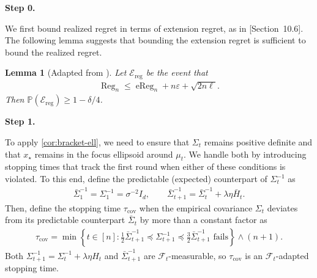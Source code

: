 \documentclass{article}
\newtheorem{lemma}[lemma]{Lemma}
\newcommand{\proofstepinline}[1]{%
    {\normalfont\normalsize\bfseries\color{blue!55!black}Step #1.}\enspace
}
\newcommand{\Pp}{\mathbb P}
\newcommand{\F}{\mathcal F}
\newcommand{\1}{\mathbf 1}
\newcommand{\eps}{\varepsilon}
\begin{document}
\proofstepinline{0}
We first bound realized regret in terms of extension regret, as in \citet{lattimore2026bandit}[Section~10.6]. The following lemma suggests that bounding the extension regret is sufficient to bound the realized regret.
\begin{lemma}[{Adapted from \citet[Section~10.6, Eq.~(10.14)]{lattimore2026bandit}}]
    \label{lem:actual-to-extension}
    Let $\mathcal E_{\mathrm{reg}}$ be the event that
    \begin{align}
        \operatorname{Reg}_n
        \leq
        \operatorname{eReg}_n
        +n\eps+\sqrt{2n\ell}.
        \label{eq:actual-to-extension}
    \end{align}
    Then $\Pp(\mathcal E_{\mathrm{reg}})\geq1-\delta/4$.
\end{lemma}
\proofstepinline{1}
To apply \cref{cor:bracket-ell}, we need to ensure that $\Sigma_t$ remains positive definite and that $x_\star$ remains in the focus ellipsoid around $\mu_t$.
We handle both by introducing stopping times that track the first round when either of these conditions is violated.
To this end, define the predictable (expected) counterpart of $\Sigma_t^{-1}$ as
\begin{align}
    \bar{\Sigma}_1^{-1}=\Sigma_1^{-1}=\sigma^{-2}I_d,
    \qquad
    \bar{\Sigma}_{t+1}^{-1}
    =\bar{\Sigma}_t^{-1}+\lambda\eta \bar{H}_t.
    \label{eq:predictable-covariance}
\end{align}
Then, define the stopping time $\tau_{\mathrm{cov}}$ when the empirical covariance $\Sigma_t$ deviates from its predictable counterpart $\bar{\Sigma}_t$ by more than a constant factor as
\begin{align}
    \tau_{\mathrm{cov}}
    =
    \min\left\{
    t \in [n]:
    \frac12 \bar{\Sigma}_{t+1}^{-1}
    \preceq
    \Sigma_{t+1}^{-1}
    \preceq
    \frac32 \bar{\Sigma}_{t+1}^{-1}
    \text{ fails}
    \right\}\wedge (n + 1).
    \label{eq:covariance-stopping-time}
\end{align}
Both $\Sigma_{t+1}^{-1} = \Sigma_t^{-1} + \lambda\eta H_t$ and $\bar{\Sigma}_{t+1}^{-1}$ are $\F_t$-measurable, so $\tau_{\mathrm{cov}}$ is an $\F_t$-adapted stopping time.
\end{document}
